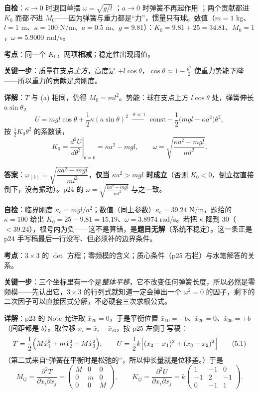 \documentclass[11pt]{ctexart}
\begin{document}
\textbf{自检}：$\kappa\to0$ 时退回单摆 $\omega=\sqrt{g/l}$ \checkmark；$a\to0$ 时弹簧不再起作用 \checkmark；两个贡献都进 $K_0$ 而都\emph{不}进 $M_0$——因为弹簧与重力都是“力”，惯量只有球。数值（$m=1$ kg、$l=1$ m、$\kappa=100$ N/m、$a=0.5$ m、$g=9.81$）：$K_0=9.81+25=34.81$、$M_0=1$，$\omega=5.9000$ rad/s。


\textbf{考点}：同一个 $K_0$，两项\textbf{相减}；稳定性出现阈值。

\textbf{关键一步}：质量在支点\emph{上方}，高度是 $+l\cos\theta$，$\cos\theta\approx1-\frac{\theta^2}{2}$ 使重力势能\emph{下降}——所以重力的贡献是\emph{负}刚度。

\textbf{详解}：$T$ 与 (a) 相同，仍得 $M_0=ml^2$。势能：球在支点上方 $l\cos\theta$ 处，弹簧伸长 $a\sin\theta$，
\[
U=mgl\cos\theta+\frac12\kappa(a\sin\theta)^2
\ \xrightarrow{\ \theta\ll1\ }\
\text{const}-\frac12\bigl(mgl-\kappa a^2\bigr)\theta^2 ,
\]
按 $\frac12K_0\theta^2$ 的系数读，
\[
K_0=\left.\frac{d^2U}{d\theta^2}\right|_{\theta=0}=\kappa a^2-mgl ,
\qquad
\omega=\sqrt{\frac{\kappa a^2-mgl}{ml^2}} .
\]

\textbf{答案}：$\omega_{(b)}=\sqrt{\dfrac{\kappa a^2-mgl}{ml^2}}$，\textbf{仅当 $\kappa a^2>mgl$ 时成立}（否则 $K_0<0$，倒立摆直接倒下，没有振动）。p24 的 $\omega=\sqrt{\frac{ka^2-mgl}{ml^2}}$ 与之一致。

\textbf{自检}：临界刚度 $\kappa_c=mgl/a^2$；数值（同上参数）$\kappa_c=39.24$ N/m，题给的 $\kappa=100$ 给出 $K_0=25-9.81=15.19$、$\omega=3.8974$ rad/s。若把 $\kappa$ 降到 $30$（$<39.24$），根号内为负——这不是算错，是\textbf{题目无解}（系统不稳定）。这一条正是 p24 手写稿最后一行没写、但必须补的边界条件。


\textbf{考点}：$3\times3$ 的 $\det$ 方程；零频模的含义；质心条件（p25 右栏）与水笔解答的关系。

\textbf{关键一步}：三个坐标里有一个是\emph{整体平移}，它不改变任何弹簧长度，所以必然是零频模——先认出它，$3\times3$ 的行列式就知道一定会掉出一个 $\omega^2=0$ 的因子，剩下的二次因子可以直接因式分解，不必硬套三次求根公式。

\textbf{详解}：p23 的 Note 允许取 $\bar x_{20}=0$，于是平衡位置 $\bar x_{10}=-b$、$\bar x_{20}=0$、$\bar x_{30}=+b$（间距都是 $b$）。取位移 $x_i=\bar x_i-\bar x_{i0}$，按 p25 左侧手写稿：
\[
T=\frac12\Bigl(M\dot x_1^2+m\dot x_2^2+M\dot x_3^2\Bigr),\qquad
U=\frac12k\Bigl[(x_2-x_1)^2+(x_3-x_2)^2\Bigr]
\tag{5.1}
\]
（第二式来自“弹簧在平衡时是松弛的”，所以伸长量就是位移差。）于是
\[
M_{ij}=\frac{\partial^2T}{\partial\dot x_i\partial\dot x_j}=\begin{pmatrix}M&0&0\\0&m&0\\0&0&M\end{pmatrix},\qquad
K_{ij}=\frac{\partial^2U}{\partial x_i\partial x_j}=k\begin{pmatrix}1&-1&0\\-1&2&-1\\0&-1&1\end{pmatrix}.
\tag{5.2}
\]
\end{document}
